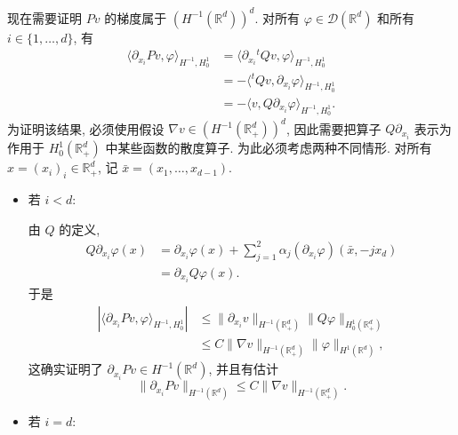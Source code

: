 \begin{Proof}
\begin{itemize}
 现在需要证明 $Pv$ 的梯度属于 $(H^{-1}(\mathbb R^d))^d$. 对所有 $\varphi\in\mathcal D(\mathbb R^d)$ 和所有 $i\in\{1,\ldots,d\}$, 有
 \[
 \begin{aligned}
  \langle\partial_{x_i}Pv,\varphi\rangle_{H^{-1},H_0^1}
  &=\langle\partial_{x_i}{}^{t}\!Qv,\varphi\rangle_{H^{-1},H_0^1}\\
  &=-\langle{}^{t}\!Qv,\partial_{x_i}\varphi\rangle_{H^{-1},H_0^1}\\
  &=-\langle v,Q\partial_{x_i}\varphi\rangle_{H^{-1},H_0^1}.
 \end{aligned}
 \]
 为证明该结果, 必须使用假设 $\nabla v\in(H^{-1}(\mathbb R_+^d))^d$, 因此需要把算子 $Q\partial_{x_i}$ 表示为作用于 $H_0^1(\mathbb R_+^d)$ 中某些函数的散度算子. 为此必须考虑两种不同情形. 对所有 $x=(x_i)_i\in\mathbb R_+^d$, 记 $\bar x=(x_1,\ldots,x_{d-1})$.

 \begin{itemize}
  \item 若 $i<d$:

  由 $Q$ 的定义,
  \[
  \begin{aligned}
   Q\partial_{x_i}\varphi(x)
   &=\partial_{x_i}\varphi(x)
   +\sum_{j=1}^2\alpha_j(\partial_{x_i}\varphi)(\bar x,-jx_d)\\
   &=\partial_{x_i}Q\varphi(x).
  \end{aligned}
  \]
  于是
  \[
  \begin{aligned}
   |\langle\partial_{x_i}Pv,\varphi\rangle_{H^{-1},H_0^1}|
   &\leq\|\partial_{x_i}v\|_{H^{-1}(\mathbb R_+^d)}
   \|Q\varphi\|_{H_0^1(\mathbb R_+^d)}\\
   &\leq C\|\nabla v\|_{H^{-1}(\mathbb R_+^d)}\|\varphi\|_{H^1(\mathbb R^d)},
  \end{aligned}
  \]
  这确实证明了 $\partial_{x_i}Pv\in H^{-1}(\mathbb R^d)$, 并且有估计
  \[
   \|\partial_{x_i}Pv\|_{H^{-1}(\mathbb R^d)}
   \leq C\|\nabla v\|_{H^{-1}(\mathbb R_+^d)}.
  \]

  \item 若 $i=d$:


\end{itemize}
\end{itemize}
\end{Proof}
